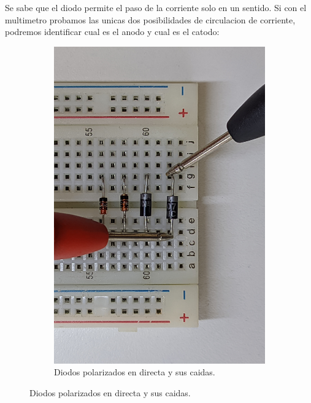\documentclass[chaptersright]{informeutn}
\begin{document}
    Se sabe que el diodo permite el paso de la corriente solo en un sentido. Si con el multimetro probamos las unicas
    dos posibilidades de circulacion de corriente, podremos identificar cual es el anodo y cual es el catodo:
    \begin{figure}[!ht]
      \begin{subfigure}[b]{1\textwidth}
        \centering
        \caption{Diodos polarizados en directa y sus caidas.}
        \begin{minipage}[b]{0.24\textwidth}
          \centering
          \includegraphics[angle=-90, width=1\textwidth]{pictures/prot_diod-1d.jpg}

\end{minipage}
\end{subfigure}
\end{figure}
\end{document}
